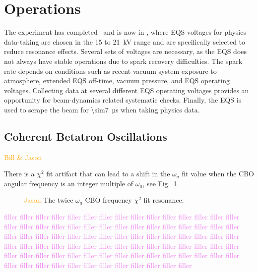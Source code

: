 \section{\label{sec:operations} Operations}

The experiment has completed \runone~and is now in \runtwo, where EQS voltages for physics data-taking are chosen in the 15 to \SI{21}{\kilo\volt} range and are specifically selected to reduce resonance effects. Several sets of voltages are necessary, as the EQS does not always have stable operations due to spark recovery difficulties. The spark rate depends on conditions such as recent vacuum system exposure to atmosphere, extended EQS off-time, vacuum pressure, and EQS operating voltages. Collecting data at several different EQS operating voltages provides an opportunity for beam-dynamics related systematic checks. Finally, the EQS is used to scrape the beam for \SI{\sim7}{\micro\second} when taking physics data.

\subsection{\label{sec:cbo} Coherent Betatron Oscillations}
\textcolor{orange}{Bill \& Jason}
\medskip

There is a $\chi^{2}$ fit artifact that can lead to a shift in the $\omega_{a}$ fit value when the CBO angular frequency is an integer multiple of $\omega_{a}$, see Fig.~\ref{fig:cbo_fit_resonance}.  
\begin{figure}[]
	\centering
	\caption{\textcolor{orange}{Jason} The twice $\omega_{a}$ CBO frequency $\chi^{2}$ fit resonance.}\label{fig:cbo_fit_resonance}
\end{figure}

\textcolor{violet}{filler filler filler filler filler filler filler filler filler filler filler filler filler filler filler filler filler filler filler filler filler filler filler filler filler filler filler filler filler filler filler filler filler filler filler filler filler filler filler filler filler filler filler filler filler filler filler filler filler filler filler filler filler filler filler filler filler filler filler filler filler filler filler filler filler filler filler filler filler filler filler filler filler filler filler filler filler filler filler filler filler filler filler filler filler filler filler}

